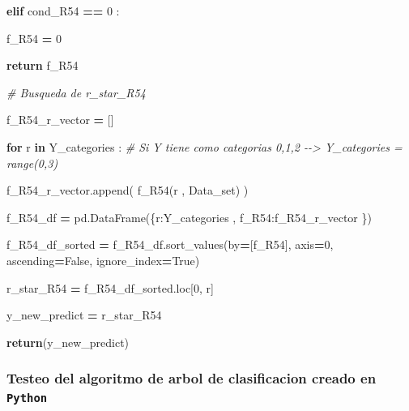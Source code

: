 \documentclass[
  11pt,
  a4paper,
]{article}
\newenvironment{Shaded}{\begin{snugshade}}{\end{snugshade}}
\newcommand{\CommentTok}[1]{\textcolor[rgb]{0.56,0.35,0.01}{\textit{#1}}}
\newcommand{\ControlFlowTok}[1]{\textcolor[rgb]{0.13,0.29,0.53}{\textbf{#1}}}
\newcommand{\DecValTok}[1]{\textcolor[rgb]{0.00,0.00,0.81}{#1}}
\newcommand{\KeywordTok}[1]{\textcolor[rgb]{0.13,0.29,0.53}{\textbf{#1}}}
\newcommand{\NormalTok}[1]{#1}
\newcommand{\OperatorTok}[1]{\textcolor[rgb]{0.81,0.36,0.00}{\textbf{#1}}}
\newcommand{\StringTok}[1]{\textcolor[rgb]{0.31,0.60,0.02}{#1}}
\newcommand{\VariableTok}[1]{\textcolor[rgb]{0.00,0.00,0.00}{#1}}
\begin{document}
\begin{Shaded}
\begin{Highlighting}[]
                        \ControlFlowTok{elif}\NormalTok{ cond\_R54 }\OperatorTok{==} \DecValTok{0}\NormalTok{ :}

\NormalTok{                            f\_R54 }\OperatorTok{=} \DecValTok{0}

                        \ControlFlowTok{return}\NormalTok{ f\_R54}

                
            \CommentTok{\# Busqueda de r\_star\_R54}

\NormalTok{                f\_R54\_r\_vector }\OperatorTok{=}\NormalTok{ []}

                \ControlFlowTok{for}\NormalTok{ r }\KeywordTok{in}\NormalTok{ Y\_categories :  }\CommentTok{\# Si Y tiene como categorias 0,1,2 {-}{-}\textgreater{} Y\_categories = range(0,3)}

\NormalTok{                    f\_R54\_r\_vector.append( f\_R54(r , Data\_set) )}

\NormalTok{                f\_R54\_df }\OperatorTok{=}\NormalTok{ pd.DataFrame(\{}\StringTok{\textquotesingle{}r\textquotesingle{}}\NormalTok{:Y\_categories  , }\StringTok{\textquotesingle{}f\_R54\textquotesingle{}}\NormalTok{:f\_R54\_r\_vector \})}
        
\NormalTok{                f\_R54\_df\_sorted }\OperatorTok{=}\NormalTok{ f\_R54\_df.sort\_values(by}\OperatorTok{=}\NormalTok{[}\StringTok{\textquotesingle{}f\_R54\textquotesingle{}}\NormalTok{], axis}\OperatorTok{=}\DecValTok{0}\NormalTok{, ascending}\OperatorTok{=}\VariableTok{False}\NormalTok{, ignore\_index}\OperatorTok{=}\VariableTok{True}\NormalTok{)}

\NormalTok{                r\_star\_R54 }\OperatorTok{=}\NormalTok{ f\_R54\_df\_sorted.loc[}\DecValTok{0}\NormalTok{, }\StringTok{\textquotesingle{}r\textquotesingle{}}\NormalTok{]}


\NormalTok{                y\_new\_predict }\OperatorTok{=}\NormalTok{ r\_star\_R54}

        


        
    \ControlFlowTok{return}\NormalTok{(y\_new\_predict)}
\end{Highlighting}
\end{Shaded}

\newpage

\hypertarget{testeo-del-algoritmo-de-arbol-de-clasificacion-creado-en-python}{%
\subsubsection{\texorpdfstring{Testeo del algoritmo de arbol de
clasificacion creado en
\texttt{Python}}{Testeo del algoritmo de arbol de clasificacion creado en Python}}\label{testeo-del-algoritmo-de-arbol-de-clasificacion-creado-en-python}}
\end{document}
